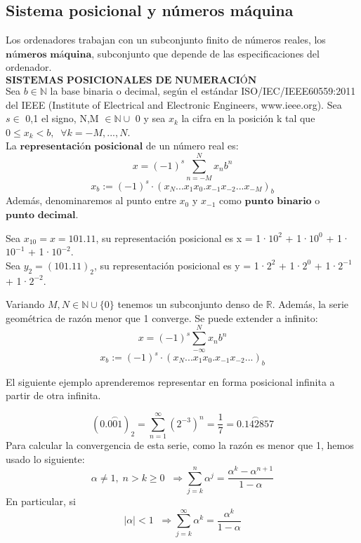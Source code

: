 \subsection{Sistema posicional y números máquina}
Los ordenadores trabajan con un subconjunto finito de números reales, los $\textbf{números máquina}$, subconjunto que depende de las especificaciones del ordenador.\\

$\textbf{SISTEMAS POSICIONALES DE NUMERACIÓN}$\\
Sea $b \in \mathbb{N}$ la base binaria o decimal, según el estándar ISO/IEC/IEEE60559:2011 del IEEE (Institute of Electrical and Electronic Engineers, www.ieee.org). Sea $s \in$ {0,1} el signo, N,M $\in \mathbb{N} \cup$ {0} y sea $x_k$ la cifra en la posición k tal que $0 \leq x_k < b, \; \; \forall k = -M, ..., N$.\\
La $\textbf{representación posicional}$ de un número real es:
\[ x = (-1)^s \sum_{n=-M}^N x_nb^n \]
\[ x_b := (-1)^s \cdot (x_N...x_1x_0.x_{-1}x_{-2}...x_{-M})_b \]
Además, denominaremos al punto entre $x_0$ y $x_{-1}$ como $\textbf{punto binario}$ o $\textbf{punto decimal}$.

\begin{ejemplo}
Sea $x_{10} = x = 101.11$, su representación posicional es x = 1·$10^2$ + 1·$10^0$ + 1·$10^{-1}$ + 1·$10^{-2}$.\\
Sea $y_2 = (101.11)_2$, su representación posicional es y = 1·$2^2$ + 1·$2^0$ + 1·$2^{-1}$ + 1·$2^{-2}$.
\end{ejemplo}

Variando $M, N \in \mathbb{N} \cup \lbrace 0 \rbrace $ tenemos un subconjunto denso de $\mathbb{R}$. Además, la serie geométrica de razón menor que 1 converge. Se puede extender a infinito:
\[ x = (-1)^s \sum_{- \infty}^N x_nb^n \]
\[ x_b := (-1)^s \cdot (x_N...x_1x_0.x_{-1}x_{-2}...)_b \]

El siguiente ejemplo aprenderemos representar en forma posicional infinita a partir de otra infinita.

\begin{ejemplo}
\[ (0.\stackrel{ \frown}{001}) _2 = \sum_{n=1}^{\infty} \left( 2^{-3} \right) ^n = \frac{1}{7} = \stackrel{ \frown}{0.142857} \]
Para calcular la convergencia de esta serie, como la razón es menor que 1, hemos usado lo siguiente:
\[ \alpha \neq 1, \; n > k \geq 0 \; \; \Rightarrow \sum_{j=k}^n \alpha ^j = \frac{\alpha ^k - \alpha ^{n+1}}{1 - \alpha} \]
En particular, si \[ \vert \alpha \vert < 1 \; \; \Rightarrow  \sum_{j=k}^\infty \alpha ^k = \frac{\alpha ^k}{1 - \alpha} \]
\end{ejemplo}



